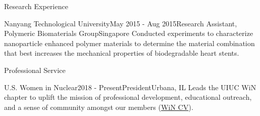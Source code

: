 \documentclass{resume2} %
\begin{document}
\begin{rSection}{Research Experience}
\begin{rSubsection}{Nanyang Technological University}{May 2015 - Aug 2015}{Research Assistant, Polymeric Biomaterials Group}{Singapore}
Conducted experiments to characterize nanoparticle enhanced polymer materials to determine the material 
combination that best increases the mechanical properties of biodegradable heart stents.  
\end{rSubsection}

\end{rSection}

\begin{rSection}{Professional Service}

	\begin{rSubsection}{U.S. Women in Nuclear}{2018 - Present}{President}{Urbana, IL}
	Leads the UIUC WiN chapter to uplift the mission of professional development, 
	educational outreach, and a sense of community amongst our members 
	(\href{https://github.com/gwenchee/wincv}{WiN CV}).
	\end{rSubsection}
	
	\end{rSection}
\end{document}
